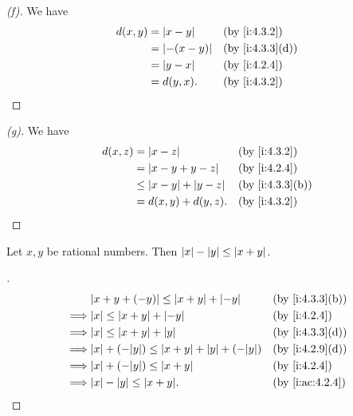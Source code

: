 \begin{proof}[(f)]
  We have
  \begin{align*}
    d(x, y) & = \abs{x - y}    &  & \by{i:4.3.2}    \\
            & = \abs{-(x - y)} &  & \by{i:4.3.3}[d] \\
            & = \abs{y - x}    &  & \by{i:4.2.4}    \\
            & = d(y, x).       &  & \by{i:4.3.2}
  \end{align*}
\end{proof}

\begin{proof}[(g)]
  We have
  \begin{align*}
    d(x, z) & = \abs{x - z}                  &  & \by{i:4.3.2}    \\
            & = \abs{x - y + y - z}          &  & \by{i:4.2.4}    \\
            & \leq \abs{x - y} + \abs{y - z} &  & \by{i:4.3.3}[b] \\
            & = d(x, y) + d(y, z).           &  & \by{i:4.3.2}
  \end{align*}
\end{proof}

\begin{ac}\label{i:ac:4.3.1}
  Let \(x, y\) be rational numbers.
  Then \(\left\lvert x\right\rvert - \left\lvert y\right\rvert \leq \left\lvert x + y\right\rvert\).
\end{ac}

\begin{proof}[]
  \begin{align*}
             & \abs{x + y + (-y)} \leq \abs{x + y} + \abs{-y}               &  & \by{i:4.3.3}[b] \\
    \implies & \abs{x} \leq \abs{x + y} + \abs{-y}                          &  & \by{i:4.2.4}    \\
    \implies & \abs{x} \leq \abs{x + y} + \abs{y}                           &  & \by{i:4.3.3}[d] \\
    \implies & \abs{x} + (-\abs{y}) \leq \abs{x + y} + \abs{y} + (-\abs{y}) &  & \by{i:4.2.9}[d] \\
    \implies & \abs{x} + (-\abs{y}) \leq \abs{x + y}                        &  & \by{i:4.2.4}    \\
    \implies & \abs{x} - \abs{y} \leq \abs{x + y}.                          &  & \by{i:ac:4.2.4}
  \end{align*}
\end{proof}

